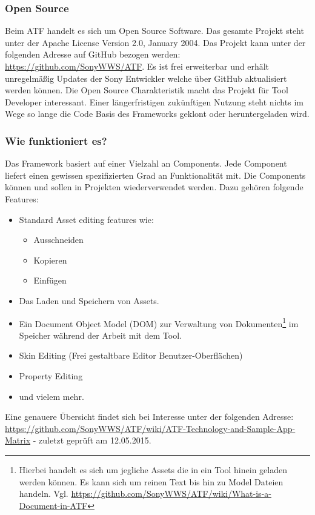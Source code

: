 \documentclass[pagesize, paper=a4, fontsize=12pt, titlepage=true, headings=small, headnosepline, abstractoff, liststotoc, nochapterprefix, plainheadsepline, twoside]{scrreprt}
\begin{document}
\subsubsection{Open Source}
Beim ATF handelt es sich um Open Source Software. Das gesamte Projekt steht unter der Apache License Version 2.0, January 2004. Das Projekt kann unter der folgenden Adresse auf GitHub bezogen werden: \url{https://github.com/SonyWWS/ATF}. Es ist frei erweiterbar und erhält unregelmäßig Updates der Sony Entwickler welche über GitHub aktualisiert werden können. Die Open Source Charakteristik macht das Projekt für Tool Developer interessant. Einer längerfristigen zukünftigen Nutzung steht nichts im Wege so lange die Code Basis des Frameworks geklont oder heruntergeladen wird. 

\subsubsection{Wie funktioniert es?}
Das Framework basiert auf einer Vielzahl an Components. Jede Component liefert einen gewissen spezifizierten Grad an Funktionalität mit. Die Components können und sollen in Projekten wiederverwendet werden. Dazu gehören folgende Features:

\begin{itemize}
\item Standard Asset editing features wie:

	\begin{itemize}
	\item Ausschneiden
	\item Kopieren
	\item Einfügen
	\end{itemize}

\item Das Laden und Speichern von Assets.
\item Ein Document Object Model (DOM) zur Verwaltung von Dokumenten\footnote{Hierbei handelt es sich um jegliche Assets die in ein Tool hinein geladen werden können. Es kann sich um reinen Text bis hin zu Model Dateien handeln. Vgl. \url{https://github.com/SonyWWS/ATF/wiki/What-is-a-Document-in-ATF}} im Speicher während der Arbeit mit dem Tool.
\item Skin Editing (Frei gestaltbare Editor Benutzer-Oberflächen)
\item Property Editing
\item und vielem mehr.
\end{itemize}

Eine genauere Übersicht findet sich bei Interesse unter der folgenden Adresse: \url{https://github.com/SonyWWS/ATF/wiki/ATF-Technology-and-Sample-App-Matrix} - zuletzt geprüft am 12.05.2015.
\end{document}
